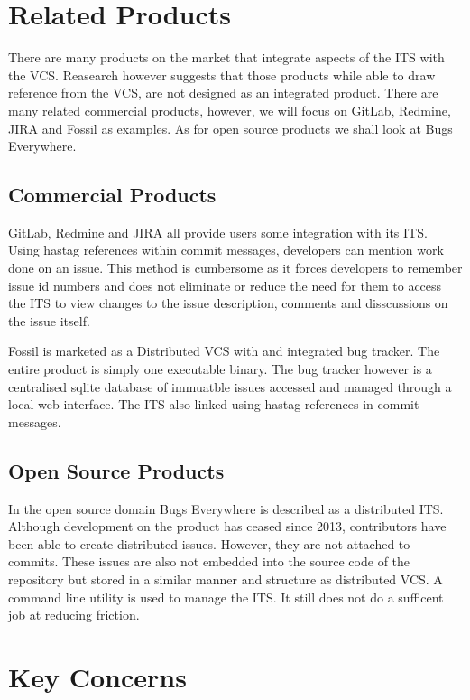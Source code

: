 \documentclass{mproj}
\begin{document}
\section{Related Products}

There are many products on the market that integrate aspects of the ITS with the VCS. Reasearch however suggests that those products while able to draw reference from the VCS, are not designed as an integrated product. There are many related commercial products, however, we will focus on GitLab, Redmine, JIRA and Fossil as examples. As for open source products we shall look at Bugs Everywhere.

\subsection{Commercial Products}

GitLab, Redmine and JIRA all provide users some integration with its ITS. Using hastag references within commit messages, developers can mention work done on an issue. This method is cumbersome as it forces developers to remember issue id numbers and does not eliminate or reduce the need for them to access the ITS to view changes to the issue description, comments and disscussions on the issue itself.

Fossil is marketed as a Distributed VCS with and integrated bug tracker. The entire product is simply one executable binary. The bug tracker however is a centralised sqlite database of immuatble issues accessed and managed through a local web interface. The ITS also linked using hastag references in commit messages.

\subsection{Open Source Products}

In the open source domain Bugs Everywhere is described as a distributed ITS. Although development on the product has ceased since 2013, contributors have been able to create distributed issues. However, they are not attached to commits. These issues are also not embedded into the source code of the repository but stored in a similar manner and structure as distributed VCS. A command line utility is used to manage the ITS. It still does not do a sufficent job at reducing friction.

\section{Key Concerns}
\end{document}
